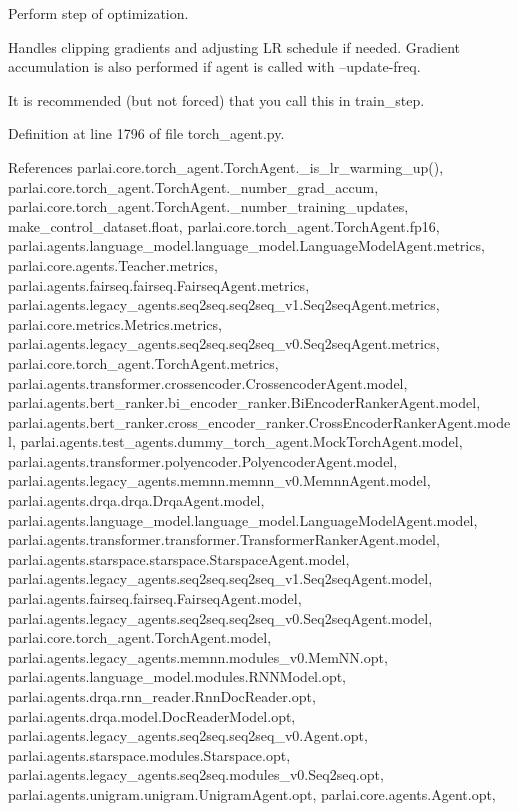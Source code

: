 \begin{DoxyVerb}Perform step of optimization.

Handles clipping gradients and adjusting LR schedule if needed.
Gradient accumulation is also performed if agent is called with
--update-freq.

It is recommended (but not forced) that you call this in train_step.
\end{DoxyVerb}
 

Definition at line 1796 of file torch\+\_\+agent.\+py.



References parlai.\+core.\+torch\+\_\+agent.\+Torch\+Agent.\+\_\+is\+\_\+lr\+\_\+warming\+\_\+up(), parlai.\+core.\+torch\+\_\+agent.\+Torch\+Agent.\+\_\+number\+\_\+grad\+\_\+accum, parlai.\+core.\+torch\+\_\+agent.\+Torch\+Agent.\+\_\+number\+\_\+training\+\_\+updates, make\+\_\+control\+\_\+dataset.\+float, parlai.\+core.\+torch\+\_\+agent.\+Torch\+Agent.\+fp16, parlai.\+agents.\+language\+\_\+model.\+language\+\_\+model.\+Language\+Model\+Agent.\+metrics, parlai.\+core.\+agents.\+Teacher.\+metrics, parlai.\+agents.\+fairseq.\+fairseq.\+Fairseq\+Agent.\+metrics, parlai.\+agents.\+legacy\+\_\+agents.\+seq2seq.\+seq2seq\+\_\+v1.\+Seq2seq\+Agent.\+metrics, parlai.\+core.\+metrics.\+Metrics.\+metrics, parlai.\+agents.\+legacy\+\_\+agents.\+seq2seq.\+seq2seq\+\_\+v0.\+Seq2seq\+Agent.\+metrics, parlai.\+core.\+torch\+\_\+agent.\+Torch\+Agent.\+metrics, parlai.\+agents.\+transformer.\+crossencoder.\+Crossencoder\+Agent.\+model, parlai.\+agents.\+bert\+\_\+ranker.\+bi\+\_\+encoder\+\_\+ranker.\+Bi\+Encoder\+Ranker\+Agent.\+model, parlai.\+agents.\+bert\+\_\+ranker.\+cross\+\_\+encoder\+\_\+ranker.\+Cross\+Encoder\+Ranker\+Agent.\+model, parlai.\+agents.\+test\+\_\+agents.\+dummy\+\_\+torch\+\_\+agent.\+Mock\+Torch\+Agent.\+model, parlai.\+agents.\+transformer.\+polyencoder.\+Polyencoder\+Agent.\+model, parlai.\+agents.\+legacy\+\_\+agents.\+memnn.\+memnn\+\_\+v0.\+Memnn\+Agent.\+model, parlai.\+agents.\+drqa.\+drqa.\+Drqa\+Agent.\+model, parlai.\+agents.\+language\+\_\+model.\+language\+\_\+model.\+Language\+Model\+Agent.\+model, parlai.\+agents.\+transformer.\+transformer.\+Transformer\+Ranker\+Agent.\+model, parlai.\+agents.\+starspace.\+starspace.\+Starspace\+Agent.\+model, parlai.\+agents.\+legacy\+\_\+agents.\+seq2seq.\+seq2seq\+\_\+v1.\+Seq2seq\+Agent.\+model, parlai.\+agents.\+fairseq.\+fairseq.\+Fairseq\+Agent.\+model, parlai.\+agents.\+legacy\+\_\+agents.\+seq2seq.\+seq2seq\+\_\+v0.\+Seq2seq\+Agent.\+model, parlai.\+core.\+torch\+\_\+agent.\+Torch\+Agent.\+model, parlai.\+agents.\+legacy\+\_\+agents.\+memnn.\+modules\+\_\+v0.\+Mem\+N\+N.\+opt, parlai.\+agents.\+language\+\_\+model.\+modules.\+R\+N\+N\+Model.\+opt, parlai.\+agents.\+drqa.\+rnn\+\_\+reader.\+Rnn\+Doc\+Reader.\+opt, parlai.\+agents.\+drqa.\+model.\+Doc\+Reader\+Model.\+opt, parlai.\+agents.\+legacy\+\_\+agents.\+seq2seq.\+seq2seq\+\_\+v0.\+Agent.\+opt, parlai.\+agents.\+starspace.\+modules.\+Starspace.\+opt, parlai.\+agents.\+legacy\+\_\+agents.\+seq2seq.\+modules\+\_\+v0.\+Seq2seq.\+opt, parlai.\+agents.\+unigram.\+unigram.\+Unigram\+Agent.\+opt, parlai.\+core.\+agents.\+Agent.\+opt, 